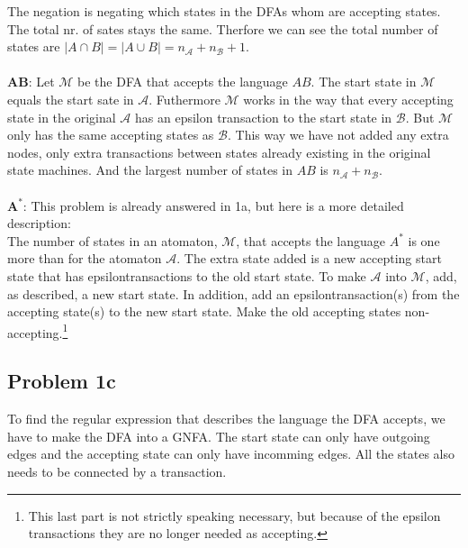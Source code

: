 \documentclass{article}
\begin{document}
The negation is negating which states in the DFAs whom are accepting states. The total nr. of sates stays the same. Therfore we can see the total number of states are $|A \cap B| = |A\cup B| = n_\mathcal A + n_\mathcal B + 1$.
\\ \ \\
$\boldsymbol{AB}$: \quad Let $\mathcal M$ be the DFA that accepts the language $AB$. The start state in $\mathcal M$ equals the start sate in $\mathcal A$. Futhermore $\mathcal M$ works in the way that every accepting state in the original $\mathcal A$ has an epsilon transaction to the start state in $\mathcal B$. But $\mathcal M $ only has the same accepting states as $\mathcal B$. This way we have not added any extra nodes, only extra transactions between states already existing in the original state machines. And the largest number of states in $AB$ is $n_\mathcal A + n_\mathcal B$.
\\ \ \\
$\boldsymbol{A^*}$: \quad This problem is already answered in 1a, but here is a more detailed description:\\The number of states in an atomaton, $\mathcal M$, that accepts the language $A^*$ is one more than  for the atomaton $\mathcal A$. The extra state added is a new accepting start state that has epsilontransactions to the old start state. To make $\mathcal A$ into $\mathcal M $, add, as described, a new start state. In addition, add an epsilontransaction(s) from the accepting state(s) to the new start state. Make the old accepting states non-accepting.\footnote{This last part is not strictly speaking necessary, but because of the epsilon transactions they are no longer needed as accepting.}

\subsection{Problem 1c}
To find the regular expression that describes the language the DFA accepts, we have to make the DFA into a GNFA. The start state can only have outgoing edges and the accepting state can only have incomming edges. All the states also needs to be connected by a transaction.
\end{document}
